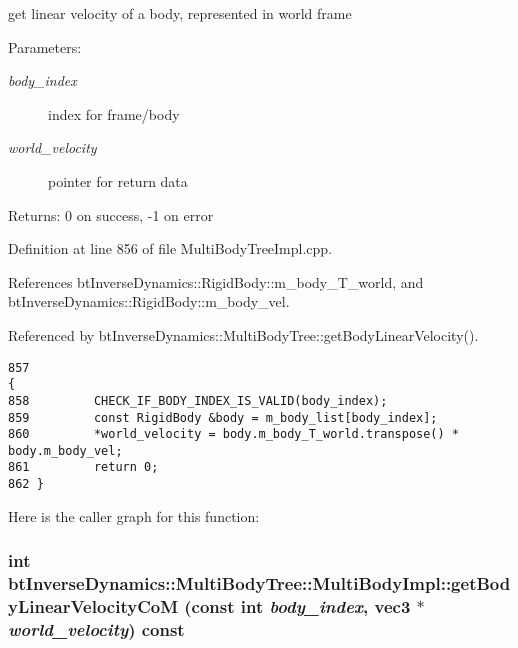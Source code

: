 get linear velocity of a body, represented in world frame \begin{Desc}
\item[Parameters:]
\begin{description}
\item[{\em body\_\-index}]index for frame/body \item[{\em world\_\-velocity}]pointer for return data \end{description}
\end{Desc}
\begin{Desc}
\item[Returns:]0 on success, -1 on error \end{Desc}
 

Definition at line 856 of file MultiBodyTreeImpl.cpp.

References btInverseDynamics::RigidBody::m\_\-body\_\-T\_\-world, and btInverseDynamics::RigidBody::m\_\-body\_\-vel.

Referenced by btInverseDynamics::MultiBodyTree::getBodyLinearVelocity().

\begin{Code}\begin{verbatim}857                                                                                                                                             {
858         CHECK_IF_BODY_INDEX_IS_VALID(body_index);
859         const RigidBody &body = m_body_list[body_index];
860         *world_velocity = body.m_body_T_world.transpose() * body.m_body_vel;
861         return 0;
862 }
\end{verbatim}
\end{Code}




Here is the caller graph for this function:\hypertarget{classbt_inverse_dynamics_1_1_multi_body_tree_1_1_multi_body_impl_0e79f2666001d56b28eb1df102aa970d}{
\subsubsection[getBodyLinearVelocityCoM]{\setlength{\rightskip}{0pt plus 5cm}int btInverseDynamics::MultiBodyTree::MultiBodyImpl::getBodyLinearVelocityCoM (const int {\em body\_\-index}, \/  {\bf vec3} $\ast$ {\em world\_\-velocity}) const}}
\label{classbt_inverse_dynamics_1_1_multi_body_tree_1_1_multi_body_impl_0e79f2666001d56b28eb1df102aa970d}


